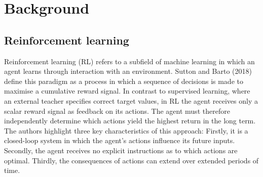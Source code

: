 \chapter{Background}\label{sec:background}

%
%
%
%
%
%
%


\section{Reinforcement learning}

Reinforcement learning (RL) refers to a subfield of machine learning in which an agent learns through interaction with an environment. Sutton and Barto (2018) \cite{sutton2018reinforcement} define this paradigm as a process in which a sequence of decisions is made to maximise a cumulative reward signal. In contrast to supervised learning, where an external teacher specifies correct target values, in RL the agent receives only a scalar reward signal as feedback on its actions. The agent must therefore independently determine which actions yield the highest return in the long term.  The authors highlight three key characteristics of this approach: Firstly, it is a closed-loop system in which the agent’s actions influence its future inputs. Secondly, the agent receives no explicit instructions as to which actions are optimal. Thirdly, the consequences of actions can extend over extended periods of time.


